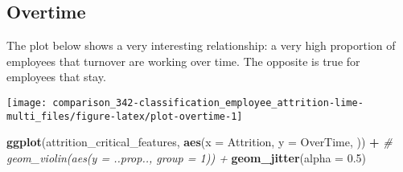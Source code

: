 \documentclass[]{book}
\newenvironment{Shaded}{\begin{snugshade}}{\end{snugshade}}
\newcommand{\CommentTok}[1]{\textcolor[rgb]{0.56,0.35,0.01}{\textit{#1}}}
\newcommand{\DataTypeTok}[1]{\textcolor[rgb]{0.13,0.29,0.53}{#1}}
\newcommand{\DecValTok}[1]{\textcolor[rgb]{0.00,0.00,0.81}{#1}}
\newcommand{\FloatTok}[1]{\textcolor[rgb]{0.00,0.00,0.81}{#1}}
\newcommand{\KeywordTok}[1]{\textcolor[rgb]{0.13,0.29,0.53}{\textbf{#1}}}
\newcommand{\NormalTok}[1]{#1}
\newcommand{\OperatorTok}[1]{\textcolor[rgb]{0.81,0.36,0.00}{\textbf{#1}}}
\newcommand{\StringTok}[1]{\textcolor[rgb]{0.31,0.60,0.02}{#1}}
\begin{document}
\hypertarget{overtime}{%
\subsection{Overtime}\label{overtime}}

The plot below shows a very interesting relationship: a very high proportion of employees that turnover are working over time. The opposite is true for employees that stay.\\

\begin{Shaded}
\end{Shaded}

\begin{center}\texttt{[image: comparison\_342-classification\_employee\_attrition-lime-multi\_files/figure-latex/plot-overtime-1]} \end{center}

\begin{Shaded}
\begin{Highlighting}[]
\KeywordTok{ggplot}\NormalTok{(attrition_critical_features, }\KeywordTok{aes}\NormalTok{(}\DataTypeTok{x =}\NormalTok{ Attrition, }
                                        \DataTypeTok{y =}\NormalTok{ OverTime,}
\NormalTok{                                        )) }\OperatorTok{+}
\StringTok{    }\CommentTok{# geom_violin(aes(y = ..prop.., group = 1)) +}
\StringTok{    }\KeywordTok{geom_jitter}\NormalTok{(}\DataTypeTok{alpha =} \FloatTok{0.5}\NormalTok{)}
\end{Highlighting}
\end{Shaded}
\end{document}
